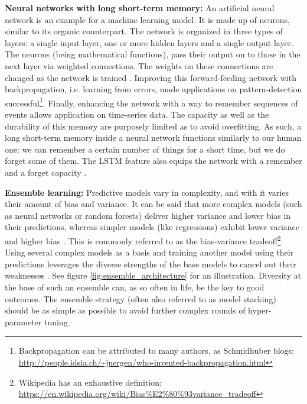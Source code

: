 \documentclass[%
	paper=A4,
	twoside=false,				%
	openright,					%
	parskip=full,				%
	chapterprefix=true,			%
	11pt,						%
	headings=normal,			%
	bibliography=totoc,			%
	listof=totoc,				%
	titlepage=on,				%
	captions=tableabove,		%
	draft=false,				%
]{scrreprt}
\begin{document}
\textbf{Neural networks with long short-term memory:} An artificial neural network is an example for a machine learning model. It is made up of neurons, similar to its organic counterpart. The network is organized in three types of layers: a single input layer, one or more hidden layers and a single output layer.
The neurons (being mathematical functions), pass their output on to those in the next layer via weighted connections. The weights on these connections are changed as the network is trained \cite{rosenblatt1958}.
Improving this forward-feeding network with backpropagation, i.e. learning from errors, made applications on pattern-detection successful\footnote{Backpropagation can be attributed to many authors, as Schmidhuber blogs: \url{http://people.idsia.ch/~juergen/who-invented-backpropagation.html}}.
Finally, enhancing the network with a way to remember sequences of events allows application on time-series data. The capacity as well as the durability of this memory are purposely limited as to avoid overfitting.
As such, a long short-term memory inside a neural network functions similarly to our human one: we can remember a certain number of things for a short time, but we do forget some of them.
The LSTM feature also equips the network with a remember and a forget capacity \cite{hochreiter1997}.

\textbf{Ensemble learning:} Predictive models vary in complexity, and with it varies their amount of bias and variance.
It can be said that more complex models (such as neural networks or random forests) deliver higher variance and lower bias in their predictions, whereas simpler models (like regressions) exhibit lower variance and higher bias \cite{lessmannBADS}.
This is commonly referred to as the bias-variance tradeoff\footnote{Wikipedia has an exhaustive definition: \url{https://en.wikipedia.org/wiki/Bias\%E2\%80\%93variance_tradeoff}}.
Using several complex models as a basis and training another model using their predictions leverages the diverse strengths of the base models to cancel out their weaknesses \cite{tsoumakas2009}. See figure \ref{fig:ensemble_architecture} for an illustration.
Diversity at the base of such an ensemble can, as so often in life, be the key to good outcomes.
The ensemble strategy (often also referred to as model stacking) should be as simple as possible to avoid further complex rounds of hyper-parameter tuning.
\end{document}
